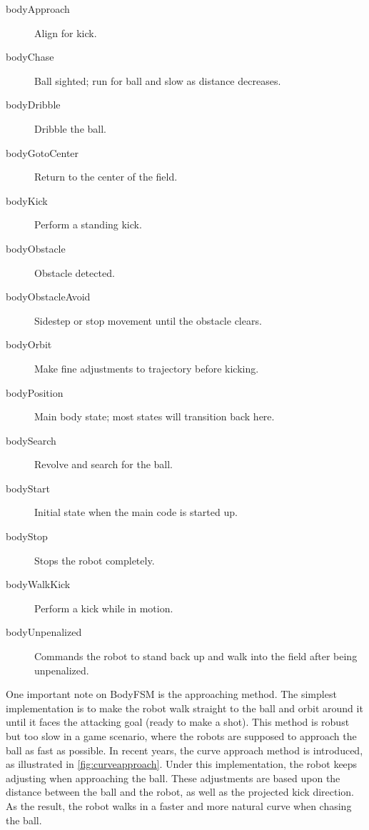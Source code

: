 \documentclass{article}
\begin{document}
	\begin{multicols}{2}
		\begin{description}
			\item[bodyApproach] Align for kick.
			\item[bodyChase] Ball sighted; run for ball and slow as distance decreases.
			\item[bodyDribble] Dribble the ball.
			\item[bodyGotoCenter] Return to the center of the field.
			\item[bodyKick] Perform a standing kick.
			\item[bodyObstacle] Obstacle detected.
			\item[bodyObstacleAvoid] Sidestep or stop movement until the obstacle clears.
			\item[bodyOrbit] Make fine adjustments to trajectory before kicking.
			\item[bodyPosition] Main body state; most states will transition back here.
			\item[bodySearch] Revolve and search for the ball.
			\item[bodyStart] Initial state when the main code is started up. 
			\item[bodyStop] Stops the robot completely.
			\item[bodyWalkKick] Perform a kick while in motion.
			\item[bodyUnpenalized] Commands the robot to stand back up and walk into the field after being unpenalized.
		\end{description}
	\end{multicols}

	One important note on BodyFSM is the approaching method. The simplest implementation is to make the robot walk straight to the ball and orbit around it until it faces the attacking goal (ready to make a shot). This method is robust but too slow in a game scenario, where the robots are supposed to approach the ball as fast as possible. In recent years, the curve approach method is introduced, as illustrated in \ref{fig:curveapproach}. Under this implementation, the robot keeps adjusting when approaching the ball. These adjustments are based upon the distance between the ball and the robot, as well as the projected kick direction. As the result, the robot walks in a faster and more natural curve when chasing the ball.
\end{document}
